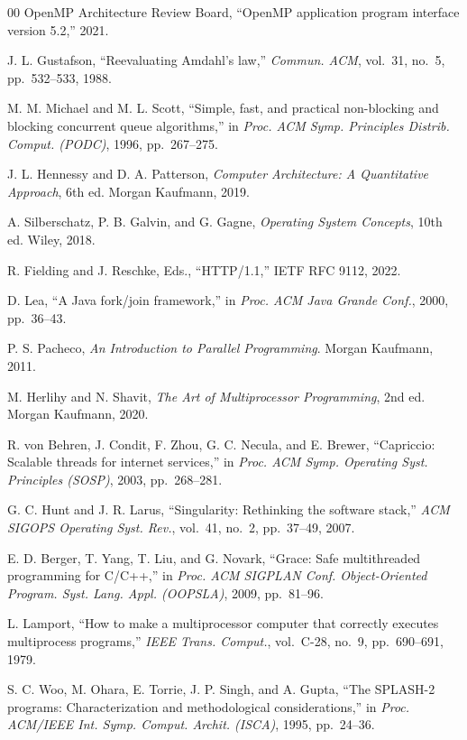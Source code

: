 \documentclass[conference]{IEEEtran}
\begin{document}
\begin{thebibliography}{00}
 OpenMP Architecture Review Board, ``OpenMP application program interface version 5.2,'' 2021.

 J. L. Gustafson, ``Reevaluating Amdahl's law,'' \textit{Commun. ACM}, vol.~31, no.~5, pp.~532--533, 1988.

 M. M. Michael and M. L. Scott, ``Simple, fast, and practical non-blocking and blocking concurrent queue algorithms,'' in \textit{Proc. ACM Symp. Principles Distrib. Comput. (PODC)}, 1996, pp.~267--275.

 J. L. Hennessy and D. A. Patterson, \textit{Computer Architecture: A Quantitative Approach}, 6th ed. Morgan Kaufmann, 2019.

 A. Silberschatz, P. B. Galvin, and G. Gagne, \textit{Operating System Concepts}, 10th ed. Wiley, 2018.

 R. Fielding and J. Reschke, Eds., ``HTTP/1.1,'' IETF RFC 9112, 2022.

 D. Lea, ``A Java fork/join framework,'' in \textit{Proc. ACM Java Grande Conf.}, 2000, pp.~36--43.

 P. S. Pacheco, \textit{An Introduction to Parallel Programming}. Morgan Kaufmann, 2011.

 M. Herlihy and N. Shavit, \textit{The Art of Multiprocessor Programming}, 2nd ed. Morgan Kaufmann, 2020.

 R. von Behren, J. Condit, F. Zhou, G. C. Necula, and E. Brewer, ``Capriccio: Scalable threads for internet services,'' in \textit{Proc. ACM Symp. Operating Syst. Principles (SOSP)}, 2003, pp.~268--281.

 G. C. Hunt and J. R. Larus, ``Singularity: Rethinking the software stack,'' \textit{ACM SIGOPS Operating Syst. Rev.}, vol.~41, no.~2, pp.~37--49, 2007.

 E. D. Berger, T. Yang, T. Liu, and G. Novark, ``Grace: Safe multithreaded programming for C/C++,'' in \textit{Proc. ACM SIGPLAN Conf. Object-Oriented Program. Syst. Lang. Appl. (OOPSLA)}, 2009, pp.~81--96.

 L. Lamport, ``How to make a multiprocessor computer that correctly executes multiprocess programs,'' \textit{IEEE Trans. Comput.}, vol.~C-28, no.~9, pp.~690--691, 1979.

 S. C. Woo, M. Ohara, E. Torrie, J. P. Singh, and A. Gupta, ``The SPLASH-2 programs: Characterization and methodological considerations,'' in \textit{Proc. ACM/IEEE Int. Symp. Comput. Archit. (ISCA)}, 1995, pp.~24--36.


\end{thebibliography}
\end{document}
